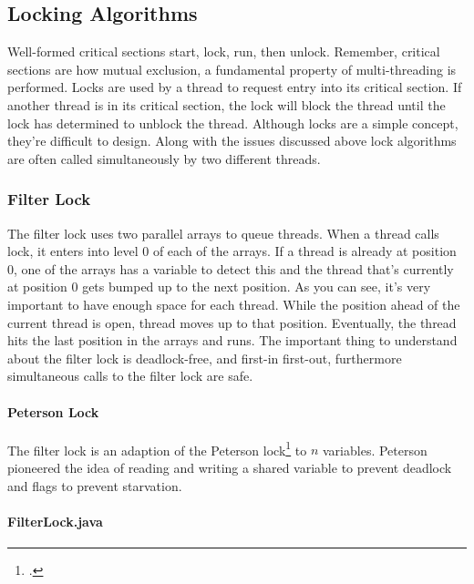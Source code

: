 \documentclass[titlepage]{article}
\begin{document}
\subsection{Locking Algorithms}

Well-formed critical sections start, lock, run, then unlock. Remember, critical sections are how mutual exclusion, a fundamental property of multi-threading is performed.  Locks are used by a thread to request entry into its critical section. If another thread is in its critical section, the lock will block the thread until the lock has determined to unblock the thread. Although locks are a simple concept, they're difficult to design. Along with the issues discussed above lock algorithms are often called simultaneously by two different threads.

\subsubsection{Filter Lock}

The filter lock uses two parallel arrays to queue threads. When a thread calls lock, it enters into level 0 of each of the arrays. If a thread is already at position 0, one of the arrays has a variable to detect this and the thread that's currently at position 0 gets bumped up to the next position. As you can see, it's very important to have enough space for each thread. While the position ahead of the current thread is open, thread moves up to that position. Eventually, the thread hits the last position in the arrays and runs. The important thing to understand about the filter lock is deadlock-free, and first-in first-out, furthermore simultaneous calls to the filter lock are safe.

\paragraph*{Peterson Lock}

The filter lock is an adaption of the Peterson lock\footcite[{P}eterson's original paper on the Peterson lock]{PETERSON1981115} to $n$ variables. Peterson pioneered the idea of reading and writing a shared variable to prevent deadlock and flags to prevent starvation.

\paragraph*{FilterLock.java}
\end{document}
